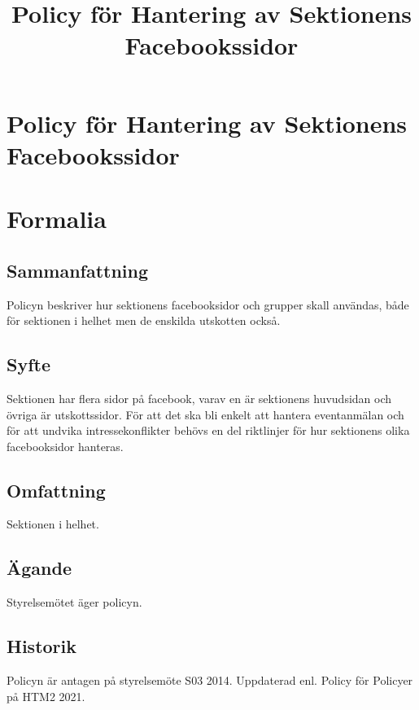 \documentclass{dsekprotokoll}
\title{Policy för Hantering av Sektionens Facebookssidor}
\author{}
\begin{document}
\section*{Policy för Hantering av Sektionens Facebookssidor}
\section{Formalia}
\subsection{Sammanfattning}
Policyn beskriver hur sektionens facebooksidor och grupper skall användas, både för sektionen i helhet men de enskilda utskotten också.
\subsection{Syfte}
Sektionen har flera sidor på facebook, varav en är sektionens huvudsidan och övriga är utskottssidor. För att det ska bli enkelt att hantera eventanmälan och för att undvika intressekonflikter behövs en del riktlinjer för hur sektionens olika facebooksidor hanteras.
\subsection{Omfattning}
Sektionen i helhet.
\subsection{Ägande}
Styrelsemötet äger policyn.
\subsection{Historik}
Policyn är antagen på styrelsemöte S03 2014.
Uppdaterad enl. Policy för Policyer på HTM2 2021.
\end{document}
